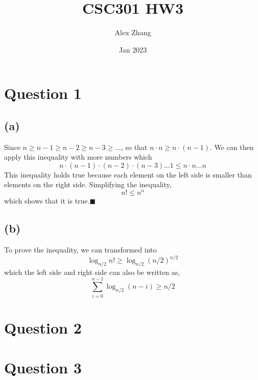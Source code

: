 \documentclass{article}
\title{CSC301 HW3}
\author{Alex Zhang}
\date{Jan 2023}
\begin{document}
\maketitle


\section*{Question 1}

    \subsection*{(a)}
    Since $n \geq n-1 \geq n-2 \geq n-3 \geq \dots $, so that $n \cdot n \geq n \cdot  (n-1)$. We can then apply this inequality
    with more numbers which  
    $$n \cdot (n-1) \cdot (n-2) \cdot (n-3) \dots  1 \leq n\cdot n \dots n$$
    This inequality holds true because each element on the left side is smaller than elements on the right side.
    Simplifying the inequality,
    $$n! \leq n^n$$
    which shows that it is true.$\blacksquare$
    \subsection*{(b)}
    To prove the inequality, we can transformed into 
    $$\log_{n/2}n! \geq \log_{n/2}(n/2)^{n/2}$$
    which the left side and right side can also be written as,
    $$\sum_{i=0}^{n-1}\log_{n/2}(n-i) \geq n/2$$


\section*{Question 2}

\section*{Question 3}
\end{document}

